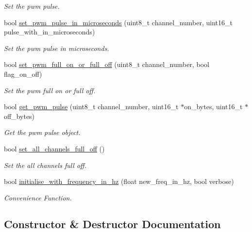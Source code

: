 \begin{DoxyCompactItemize}
\begin{DoxyCompactList}\small\item\em Set the pwm pulse. \end{DoxyCompactList}\item 
bool \hyperlink{class_p_c_a9685_ada3824103e58b3e76fdb3a5bac8bdda4}{set\+\_\+pwm\+\_\+pulse\+\_\+in\+\_\+microseconds} (uint8\+\_\+t channel\+\_\+number, uint16\+\_\+t pulse\+\_\+with\+\_\+in\+\_\+microseconds)
\begin{DoxyCompactList}\small\item\em Set the pwm pulse in microseconds. \end{DoxyCompactList}\item 
bool \hyperlink{class_p_c_a9685_adaaf3ea65a4a6bfccda3455b7018a86f}{set\+\_\+pwm\+\_\+full\+\_\+on\+\_\+or\+\_\+full\+\_\+off} (uint8\+\_\+t channel\+\_\+number, bool flag\+\_\+on\+\_\+off)
\begin{DoxyCompactList}\small\item\em Set the pwm full on or full off. \end{DoxyCompactList}\item 
bool \hyperlink{class_p_c_a9685_a3e30f34a9931802aad9821baf28b323f}{get\+\_\+pwm\+\_\+pulse} (uint8\+\_\+t channel\+\_\+number, uint16\+\_\+t $\ast$on\+\_\+bytes, uint16\+\_\+t $\ast$off\+\_\+bytes)
\begin{DoxyCompactList}\small\item\em Get the pwm pulse object. \end{DoxyCompactList}\item 
bool \hyperlink{class_p_c_a9685_aec57fdfeddc3f1bf4b3e307020928a07}{set\+\_\+all\+\_\+channels\+\_\+full\+\_\+off} ()
\begin{DoxyCompactList}\small\item\em Set the all channels full off. \end{DoxyCompactList}\item 
bool \hyperlink{class_p_c_a9685_a6cb42d6b771efa1927378bbf088a475f}{initialise\+\_\+with\+\_\+frequency\+\_\+in\+\_\+hz} (float new\+\_\+freq\+\_\+in\+\_\+hz, bool verbose)
\begin{DoxyCompactList}\small\item\em Convenience Function. \end{DoxyCompactList}\end{DoxyCompactItemize}


\subsection{Constructor \& Destructor Documentation}
\mbox{\label{class_p_c_a9685_aa56013941d7e226767547d248804db05}} 

